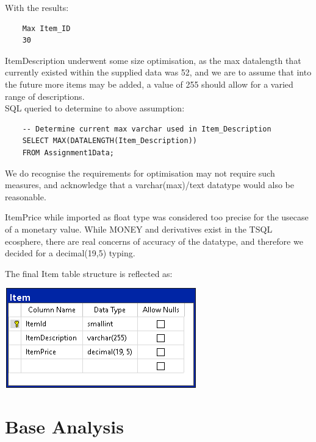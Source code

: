 \documentclass{article}
\begin{document}
                With the results:
                \begin{verbatim}
    Max Item_ID
    30
                \end{verbatim}
                ItemDescription underwent some size optimisation, as the max datalength 
                that currently existed within the supplied data was 52, and we are to assume
                that into the future more items may be added, a value of 255 should allow
                for a varied range of descriptions.
                \\
                SQL queried to determine to above assumption:
                \begin{verbatim}
    -- Determine current max varchar used in Item_Description
    SELECT MAX(DATALENGTH(Item_Description)) 
    FROM Assignment1Data;
                \end{verbatim}
                We do recognise the requirements for optimisation may not require such measures, and 
                acknowledge that a varchar(max)/text datatype would also be reasonable.
                \vspace{5mm}
                \par\noindent
                ItemPrice while imported as float type was considered too precise for the usecase of 
                a monetary value. While MONEY and derivatives exist in the TSQL ecosphere, there are 
                real concerns of accuracy of the datatype\cite{MoneyIssues}, and therefore we decided for 
                a decimal(19,5) typing\cite{Numeric}.
                \vspace{5mm}
                \par\noindent
                The final Item table structure is reflected as:
                \begin{center}
                    \includegraphics{Images/Item_Table.png}
                \end{center}
    \newpage
    \section{Base Analysis}
\end{document}

